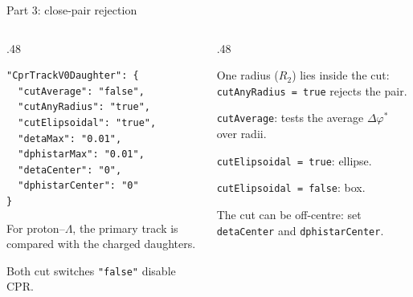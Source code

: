 \begin{frame}[fragile]{Part 3: close-pair rejection}
 \begin{columns}[T]
 \begin{column}{.48\textwidth}
 \begin{lstlisting}
"CprTrackV0Daughter": {
  "cutAverage": "false",
  "cutAnyRadius": "true",
  "cutElipsoidal": "true",
  "detaMax": "0.01",
  "dphistarMax": "0.01",
  "detaCenter": "0",
  "dphistarCenter": "0"
}
 \end{lstlisting}
 \small For proton--$\Lambda$, the primary track is compared with the charged daughters.\par\medskip
 Both cut switches \texttt{"false"} disable CPR.
 \end{column}
 \begin{column}{.48\textwidth}
 \centering
 \par\smallskip
 \footnotesize One radius ($R_2$) lies inside the cut: \texttt{cutAnyRadius = true} rejects the pair.\par\medskip
 \texttt{cutAverage}: tests the average $\Delta\varphi^*$ over radii.\par\medskip
 \texttt{cutElipsoidal = true}: ellipse.\par
 \texttt{cutElipsoidal = false}: box.\par\smallskip
 The cut can be off-centre: set \texttt{detaCenter} and \texttt{dphistarCenter}.
 \end{column}
 \end{columns}
\end{frame}

